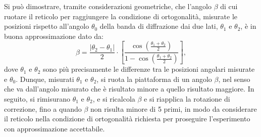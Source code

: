 \documentclass[a4paper,12pt]{article}
\begin{document}
Si può dimostrare, tramite considerazioni geometriche, che l’angolo \( \beta \) di cui ruotare il reticolo per raggiungere la condizione di ortogonalità, misurate le posizioni rispetto all’angolo \( \theta_0 \) della banda di diffrazione dai due lati, \( \theta_1 \) e \( \theta_2 \), è in buona approssimazione dato da:
\[
\beta = \frac{|\theta_2 - \theta_1|}{2} \cdot \left[ \frac{\cos\left(\frac{\theta_1 + \theta_2}{2}\right)}{1 - \cos\left(\frac{\theta_1 + \theta_2}{2}\right)} \right],
\]
dove \( \theta_1 \) e \( \theta_2 \) sono più precisamente le differenze tra le posizioni angolari misurate e \( \theta_0 \).
Dunque, misurati \( \theta_1 \) e \( \theta_2 \), si ruota la piattaforma di un angolo \( \beta \), nel senso che va dall’angolo misurato che è risultato minore a quello risultato maggiore. In seguito, si rimisurano \( \theta_1 \) e \( \theta_2 \), e si ricalcola \( \beta \) e si riapplica la rotazione di correzione, fino a quando \( \beta \) non risulta minore di 5 primi, in modo da considerare il reticolo nella condizione di ortogonalità richiesta per proseguire l’esperimento con approssimazione accettabile.
\end{document}
